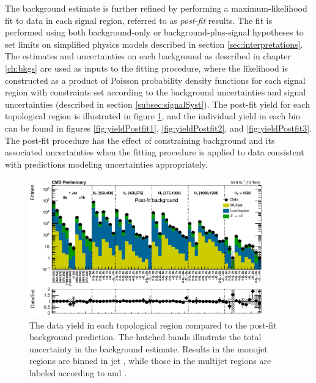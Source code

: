 The background estimate is further refined by performing a maximum-likelihood fit to data in each signal region, referred to as {\it post-fit} results. The fit is performed using both background-only or background-plus-signal hypotheses to set limits on simplified physics models described in section \ref{sec:interpretations}. The estimates and uncertainties on each background as described in chapter \ref{ch:bkgs} are  used as inputs to the fitting procedure, where the likelihood is constructed as a product of Poisson probability density functions for each signal region with constraints set according to the background uncertainties and signal uncertainties (described in section \ref{subsec:signalSyst}). The post-fit yield for each topological region is illustrated in figure \ref{fig:yieldPostfitTopological}, and the individual yield in each \mttwo bin can be found in figures \ref{fig:yieldPostfit1}, \ref{fig:yieldPostfit2}, and \ref{fig:yieldPostfit3}. The post-fit procedure has the effect of constraining background and its associated uncertainties when the fitting procedure is applied to data consistent with predictions modeling uncertainties appropriately.
\begin{figure}
	\centering
	\includegraphics[width=0.90\textwidth]{results/figs/postfit/mt2_ALL_fullEstimate}
	\caption{The data yield in each topological region compared to the post-fit background prediction. The hatched bands illustrate the total uncertainty in the background estimate. Results in the monojet regions are binned in jet \pt, while those in the multijet regions are labeled according to \nj and \nb.}
	\label{fig:yieldPostfitTopological}
\end{figure}
